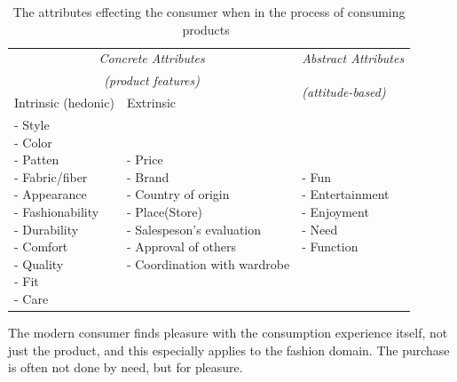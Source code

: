 \begin{table}[H]
    \centering
    \begin{tabular}{l|l|l}
      \multicolumn{2}{c|}{\emph{Concrete Attributes}} & \emph{Abstract Attributes} \\
      \multicolumn{2}{c|}{\emph{(product features)}} & \multirow{2}{*}{\emph{(attitude-based)}} \\ \cline{1-2}
      Intrinsic (hedonic)   & Extrinsic & \\ \hline
      \pbox{4cm}{
          - Style \\
          - Color \\
          - Patten \\
          - Fabric/fiber \\
          - Appearance \\
          - Fashionability \\
          - Durability \\
          - Comfort \\
          - Quality \\
          - Fit \\
          - Care \\
      } & \pbox{6cm}{
          - Price \\
          - Brand \\
          - Country of origin \\
          - Place(Store) \\
          - Salespeson's evaluation \\
          - Approval of others \\
          - Coordination with wardrobe \\
      } & \pbox{4cm}{
          - Fun \\
          - Entertainment \\
          - Enjoyment \\
          - Need \\
          - Function \\
        } \\ \hline
    \end{tabular}
    \caption[Consumers' Purchase Decisions]{The attributes effecting the consumer when in the process of consuming products~\cite{dutton2006}}
    \label{table:ConsumersPurchaseDec}
\end{table}

The modern consumer finds pleasure with the consumption experience itself, not
just the product, and this especially applies to the fashion domain.  The
purchase is often not done by need, but for pleasure.


